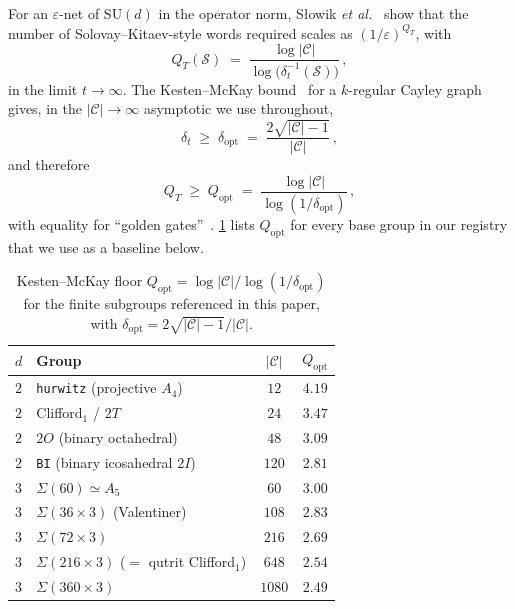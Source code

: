 \documentclass[twocolumn,superscriptaddress,showpacs,nofootinbib,notitlepage,preprintnumbers,secnumarabic,amssymb, nobibnotes, aps, prd]{revtex4-2}
\let\origtoprule\toprule
\let\origbottomrule\bottomrule
\renewcommand{\toprule}{\origtoprule\origtoprule}%
\renewcommand{\bottomrule}{\origbottomrule\origbottomrule}%
\newcommand{\QT}{Q_{T}}              %
\newcommand{\Popt}{Q_{\mathrm{opt}}} %
\newcommand{\Sigmathree}[1]{\Sigma(#1\!\times\!3)} %
\begin{document}
For an $\varepsilon$-net of $\mathrm{SU}(d)$ in the operator norm, Słowik \emph{et al.}~\cite{Slowik:2025qco} show that the number of Solovay--Kitaev-style words required scales as $(1/\varepsilon)^{\QT}$, with
\begin{equation}
  \QT(\mathcal{S}) \;=\; \frac{\log|\mathcal{C}|}{\log\bigl(\delta_t^{-1}(\mathcal{S})\bigr)}\,,
  \label{eq:QT}
\end{equation}
in the limit $t \to \infty$. The Kesten--McKay bound~\cite{Kesten:1959symmetric,McKay:1981eigenvalue,Lubotzky:1994expander} for a $k$-regular Cayley graph gives, in the $|\mathcal{C}|\to\infty$ asymptotic we use throughout,
\begin{equation}
  \delta_t \;\geq\; \delta_\mathrm{opt} \;=\; \frac{2\sqrt{|\mathcal{C}|-1}}{|\mathcal{C}|}\,,
  \label{eq:delta_opt}
\end{equation}
and therefore
\begin{equation}
  \QT \;\geq\; \Popt \;=\; \frac{\log|\mathcal{C}|}{\log(1/\delta_\mathrm{opt})}\,,
  \label{eq:Popt}
\end{equation}
with equality for ``golden gates''~\cite{Sarnak:2015}. \cref{tab:popt} lists $\Popt$ for every base group in our registry that we use as a baseline below.

\begin{table}[t]
\centering
\caption{\label{tab:popt}Kesten--McKay floor $\Popt = \log|\mathcal{C}|/\log(1/\delta_\mathrm{opt})$ for the finite subgroups referenced in this paper, with $\delta_\mathrm{opt} = 2\sqrt{|\mathcal{C}|-1}/|\mathcal{C}|$.}
\begin{tabular}{@{}llcc@{}}
\toprule
$d$ & Group & $|\mathcal{C}|$ & $\Popt$ \\
\midrule
$2$ & \texttt{hurwitz} (projective $A_4$) & $12$ & $4.19$ \\
$2$ & Clifford$_1$ / $2T$                & $24$ & $3.47$ \\
$2$ & $2O$ (binary octahedral)           & $48$ & $3.09$ \\
$2$ & \texttt{BI} (binary icosahedral $2I$) & $120$ & $2.81$ \\
$3$ & $\Sigma(60) \simeq A_5$            & $60$ & $3.00$ \\
$3$ & $\Sigmathree{36}$ (Valentiner)     & $108$ & $2.83$ \\
$3$ & $\Sigmathree{72}$                  & $216$ & $2.69$ \\
$3$ & $\Sigmathree{216}$ ($=$ qutrit Clifford$_1$) & $648$ & $2.54$ \\
$3$ & $\Sigmathree{360}$                 & $1080$ & $2.49$ \\
\bottomrule
\end{tabular}
\end{table}
\end{document}
